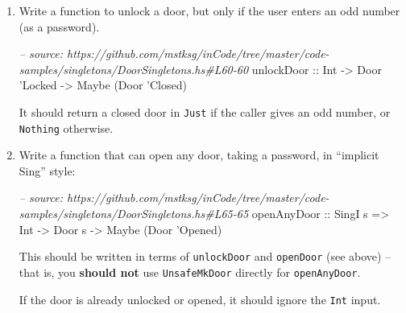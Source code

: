 \documentclass[]{article}
\newenvironment{Shaded}{\begin{snugshade}}{\end{snugshade}}
\newcommand{\CharTok}[1]{\textcolor[rgb]{0.31,0.60,0.02}{#1}}
\newcommand{\CommentTok}[1]{\textcolor[rgb]{0.56,0.35,0.01}{\textit{#1}}}
\newcommand{\DataTypeTok}[1]{\textcolor[rgb]{0.13,0.29,0.53}{#1}}
\newcommand{\NormalTok}[1]{#1}
\newcommand{\OtherTok}[1]{\textcolor[rgb]{0.56,0.35,0.01}{#1}}
\begin{document}
\begin{enumerate}
\def\labelenumi{\arabic{enumi}.}
\item
  Write a function to unlock a door, but only if the user enters an odd number
  (as a password).

\begin{Shaded}
\begin{Highlighting}[]
\CommentTok{-- source: https://github.com/mstksg/inCode/tree/master/code-samples/singletons/DoorSingletons.hs#L60-60}
\OtherTok{unlockDoor ::} \DataTypeTok{Int} \OtherTok{->} \DataTypeTok{Door} \CharTok{'Locked -> Maybe (Door '}\DataTypeTok{Closed}\NormalTok{)}
\end{Highlighting}
\end{Shaded}

  It should return a closed door in \texttt{Just} if the caller gives an odd
  number, or \texttt{Nothing} otherwise.
\item
  Write a function that can open any door, taking a password, in ``implicit
  Sing'' style:

\begin{Shaded}
\begin{Highlighting}[]
\CommentTok{-- source: https://github.com/mstksg/inCode/tree/master/code-samples/singletons/DoorSingletons.hs#L65-65}
\OtherTok{openAnyDoor ::} \DataTypeTok{SingI}\NormalTok{ s }\OtherTok{=>} \DataTypeTok{Int} \OtherTok{->} \DataTypeTok{Door}\NormalTok{ s }\OtherTok{->} \DataTypeTok{Maybe}\NormalTok{ (}\DataTypeTok{Door} \CharTok{'Opened)}
\end{Highlighting}
\end{Shaded}

  This should be written in terms of \texttt{unlockDoor} and \texttt{openDoor}
  (see above) -- that is, you \textbf{should not} use \texttt{UnsafeMkDoor}
  directly for \texttt{openAnyDoor}.

  If the door is already unlocked or opened, it should ignore the \texttt{Int}
  input.
\end{enumerate}
\end{document}
